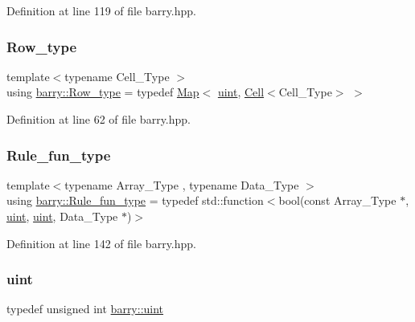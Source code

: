 Definition at line 119 of file barry.\+hpp.

\mbox{\label{namespacebarry_a741876d7060484e80a9f2b9d128d2c8d}} 
\subsubsection{\texorpdfstring{Row\+\_\+type}{Row\_type}}
{\footnotesize\ttfamily template$<$typename Cell\+\_\+\+Type $>$ \\
using \hyperlink{namespacebarry_a741876d7060484e80a9f2b9d128d2c8d}{barry\+::\+Row\+\_\+type} = typedef \hyperlink{namespacebarry_a979a04835a9855ff2054c383c569c89e}{Map}$<$ \hyperlink{namespacebarry_a11dfc53ddb4672278319aa04f1e09a6c}{uint}, \hyperlink{classbarry_1_1_cell}{Cell}$<$Cell\+\_\+\+Type$>$ $>$}



Definition at line 62 of file barry.\+hpp.

\mbox{\label{namespacebarry_aefd7e6d4ba228e2ce1074d075c512178}} 
\subsubsection{\texorpdfstring{Rule\+\_\+fun\+\_\+type}{Rule\_fun\_type}}
{\footnotesize\ttfamily template$<$typename Array\+\_\+\+Type , typename Data\+\_\+\+Type $>$ \\
using \hyperlink{namespacebarry_aefd7e6d4ba228e2ce1074d075c512178}{barry\+::\+Rule\+\_\+fun\+\_\+type} = typedef std\+::function$<$bool(const Array\+\_\+\+Type $\ast$, \hyperlink{namespacebarry_a11dfc53ddb4672278319aa04f1e09a6c}{uint}, \hyperlink{namespacebarry_a11dfc53ddb4672278319aa04f1e09a6c}{uint}, Data\+\_\+\+Type $\ast$)$>$}



Definition at line 142 of file barry.\+hpp.

\mbox{\label{namespacebarry_a11dfc53ddb4672278319aa04f1e09a6c}} 
\subsubsection{\texorpdfstring{uint}{uint}}
{\footnotesize\ttfamily typedef unsigned int \hyperlink{namespacebarry_a11dfc53ddb4672278319aa04f1e09a6c}{barry\+::uint}}



